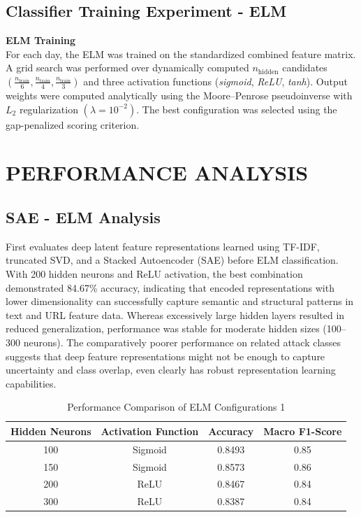 \subsection{Classifier Training Experiment - ELM}
\textbf{ELM Training}\\

For each day, the ELM was trained on the standardized combined feature matrix. A grid search was performed over dynamically computed $n_{\text{hidden}}$ candidates $\left(\frac{n_{\text{train}}}{6}, \frac{n_{\text{train}}}{4}, \frac{n_{\text{train}}}{3}\right)$ and three activation functions (\textit{sigmoid}, \textit{ReLU}, \textit{tanh}). Output weights were computed analytically using the Moore--Penrose pseudoinverse with $L_2$ regularization $(\lambda = 10^{-2})$. The best configuration was selected using the gap-penalized scoring criterion.

\vspace{0.5em}

\section{PERFORMANCE ANALYSIS}
\subsection{SAE - ELM Analysis} 
First evaluates deep latent feature representations learned using TF-IDF, truncated SVD, and a Stacked Autoencoder (SAE) before ELM classification. With 200 hidden neurons and ReLU activation, the best combination demonstrated 84.67\% accuracy, indicating that encoded representations with lower dimensionality can successfully capture semantic and structural patterns in text and URL feature data. Whereas excessively large hidden layers resulted in reduced generalization, performance was stable for moderate hidden sizes (100–300 neurons). The comparatively poorer performance on related attack classes suggests that deep feature representations might not be enough to capture uncertainty and class overlap, even clearly has robust representation learning capabilities.

\begin{table}[h]
\centering
\caption{Performance Comparison of ELM Configurations 1}
\label{tab:elm_pipeline1}
\begin{tabular}{|c|c|c|c|}
\hline
\textbf{Hidden Neurons} & \textbf{Activation Function} & \textbf{Accuracy} & \textbf{Macro F1-Score} \\ \hline
100 & Sigmoid & 0.8493 & 0.85 \\ \hline
150 & Sigmoid & 0.8573 & 0.86 \\ \hline
200 & ReLU    & 0.8467 & 0.84 \\ \hline
300 & ReLU    & 0.8387 & 0.84 \\ \hline
\end{tabular}
\end{table}

